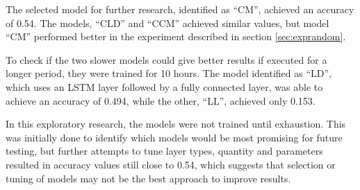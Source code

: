 The selected model for further research, identified as ``CM'', achieved an accuracy of 0.54. The models, ``CLD'' and ``CCM'' achieved similar values, but model ``CM'' performed better in the experiment described in section \ref{sec:exprandom}.

To check if the two slower models could give better results if executed for a longer period, they were trained for 10 hours. The model identified as ``LD'', which uses an LSTM layer followed by a fully connected layer, was able to achieve an accuracy of 0.494, while the other, ``LL'', achieved only 0.153.


In this exploratory research, the models were not trained until exhaustion. This was initially done to identify which models would be most promising for future testing, but further attempts to tune layer types, quantity and parameters resulted in accuracy values still close to 0.54, which suggests that selection or tuning of models may not be the best approach to improve results.
